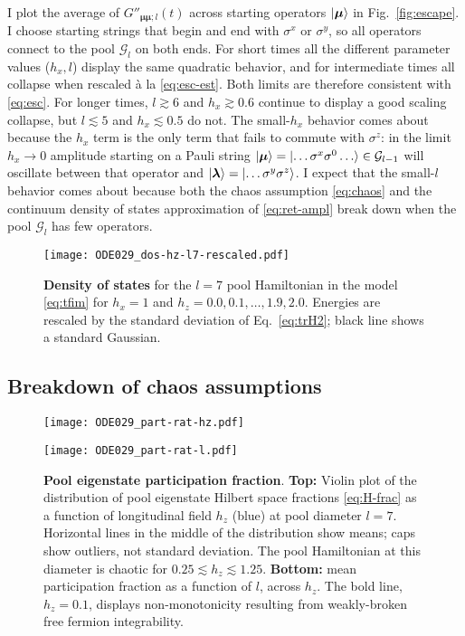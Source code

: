 \documentclass[aps,prb,nofootinbib,twocolumn,balancelastpage,amsmath,amssymb,floatfix,superscriptaddress,]{revtex4-1}
\newcommand{\pool}{\mathcal G}
\begin{document}
{I plot the average of $G''_{\bm\mu\bm\mu;l}(t)$ across starting operators $\ket {\bm \mu}$ in Fig.~\ref{fig:escape}.
I choose starting strings that begin and end with $\sigma^x$ or $\sigma^y$,
so all operators connect to the pool $\pool_{l}$ on both ends.
For short times all the different parameter values ($h_x, l$) display the same quadratic behavior,
and for intermediate times all collapse when rescaled \`a la \eqref{eq:esc-est}.
Both limits are therefore consistent with \eqref{eq:esc}.
For longer times, $l \gtrsim 6$ and $h_x \gtrsim 0.6$ continue to display a good scaling collapse,
but $l \lesssim 5$ and $h_x \lesssim 0.5$  do not.
The small-$h_x$ behavior comes about because the $h_x$ term is the only term that fails to commute with $\sigma^z$:
in the limit $h_x \to 0$ amplitude starting on a Pauli string $\ket{\bm \mu} = \ket{\dots \sigma^x\sigma^0\dots}\in\pool_{l-1}$ will oscillate between that operator and $\ket{\bm \lambda} = \ket{\dots \sigma^y\sigma^z}$.
I expect that the small-$l$ behavior comes about because both the chaos assumption \eqref{eq:chaos} and the continuum density of states approximation of \eqref{eq:ret-ampl} break down when the pool $\pool_l$ has few operators.


\begin{figure}[t]
  \centering
  \texttt{[image: ODE029\_dos-hz-l7-rescaled.pdf]}
  \caption{\textbf{Density of states} for the $l = 7$ pool Hamiltonian in the model \eqref{eq:tfim} for $h_x = 1$ and $h_z = 0.0, 0.1, \dots, 1.9, 2.0$. Energies are rescaled by the standard deviation of Eq.~\eqref{eq:trH2}; black line shows a standard Gaussian.}
  \label{fig:gaussian-dos}
\end{figure} 


\subsection{ Breakdown of chaos assumptions}\label{ss:chaos-breakdown}

\begin{figure}[t]
  \centering
  \begin{minipage}{0.45\textwidth} 
    \texttt{[image: ODE029\_part-rat-hz.pdf]}
  \end{minipage}
  \begin{minipage}{0.45\textwidth}
  \texttt{[image: ODE029\_part-rat-l.pdf]}
  \end{minipage}
  
  \caption{
    \textbf{Pool eigenstate participation fraction}.
    \textbf{Top:} Violin plot of the distribution of pool eigenstate Hilbert space fractions \eqref{eq:H-frac}
    as a function of longitudinal field $h_z$ (blue) at pool diameter $l = 7$.
    Horizontal lines in the middle of the distribution show means;
    caps show outliers, not standard deviation.
    The pool Hamiltonian at this diameter is chaotic for $0.25 \lesssim h_z \lesssim 1.25$.
    \textbf{Bottom:} mean participation fraction as a function of $l$, across $h_z$.
    The bold line, $h_z = 0.1$, displays non-monotonicity resulting from weakly-broken free fermion integrability.
    }
  \label{fig:participation-fraction}
\end{figure}

}
\end{document}
